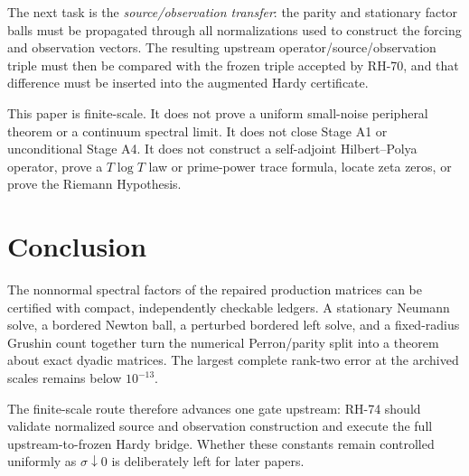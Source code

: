 \documentclass[11pt]{article}
\theoremstyle{definition}
\begin{document}
The next task is the \emph{source/observation transfer}: the parity and
stationary factor balls must be propagated through all normalizations used to
construct the forcing and observation vectors.  The resulting upstream
operator/source/observation triple must then be compared with the frozen triple
accepted by RH-70, and that difference must be inserted into the augmented
Hardy certificate.

This paper is finite-scale.  It does not prove a uniform small-noise
peripheral theorem or a continuum spectral limit.  It does not close Stage A1
or unconditional Stage A4.  It does not construct a self-adjoint
Hilbert--Polya operator, prove a $T\log T$ law or prime-power trace formula,
locate zeta zeros, or prove the Riemann Hypothesis.

\section{Conclusion}

The nonnormal spectral factors of the repaired production matrices can be
certified with compact, independently checkable ledgers.  A stationary
Neumann solve, a bordered Newton ball, a perturbed bordered left solve, and a
fixed-radius Grushin count together turn the numerical Perron/parity split into
a theorem about exact dyadic matrices.  The largest complete rank-two error at
the archived scales remains below $10^{-13}$.

The finite-scale route therefore advances one gate upstream: RH-74 should
validate normalized source and observation construction and execute the full
upstream-to-frozen Hardy bridge.  Whether these constants remain controlled
uniformly as $\sigma\downarrow0$ is deliberately left for later papers.



\end{document}
